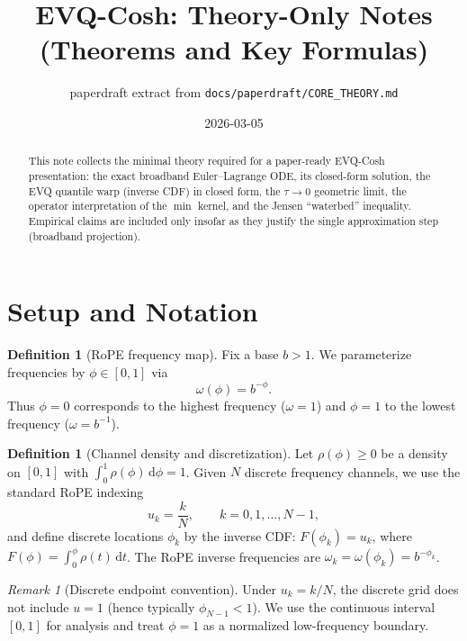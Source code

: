 \documentclass[11pt]{article}
\title{EVQ-Cosh: Theory-Only Notes (Theorems and Key Formulas)}
\author{paperdraft extract from \texttt{docs/paperdraft/CORE\_THEORY.md}}
\date{2026-03-05}
\theoremstyle{plain}
\theoremstyle{definition}
\newtheorem{definition}[theorem]{Definition}
\theoremstyle{remark}
\newtheorem{remark}[theorem]{Remark}
\newcommand{\dd}{\,\mathrm{d}}
\begin{document}
\maketitle

\begin{abstract}
This note collects the minimal theory required for a paper-ready EVQ-Cosh
presentation: the exact broadband Euler--Lagrange ODE, its closed-form solution,
the EVQ quantile warp (inverse CDF) in closed form, the $\tau\to 0$ geometric
limit, the operator interpretation of the $\min$ kernel, and the Jensen
``waterbed'' inequality. Empirical claims are included only insofar as they
justify the single approximation step (broadband projection).
\end{abstract}

\section{Setup and Notation}

\begin{definition}[RoPE frequency map]
Fix a base $b>1$. We parameterize frequencies by $\phi\in[0,1]$ via
\begin{equation}
\omega(\phi)=b^{-\phi}.
\end{equation}
Thus $\phi=0$ corresponds to the highest frequency ($\omega=1$) and $\phi=1$ to
the lowest frequency ($\omega=b^{-1}$).
\end{definition}

\begin{definition}[Channel density and discretization]
Let $\rho(\phi)\ge 0$ be a density on $[0,1]$ with $\int_0^1\rho(\phi)\dd\phi=1$.
Given $N$ discrete frequency channels, we use the standard RoPE indexing
\begin{equation}
u_k=\frac{k}{N},\qquad k=0,1,\dots,N-1,
\end{equation}
and define discrete locations $\phi_k$ by the inverse CDF:
$F(\phi_k)=u_k$, where $F(\phi)=\int_0^\phi\rho(t)\dd t$.
The RoPE inverse frequencies are $\omega_k=\omega(\phi_k)=b^{-\phi_k}$.
\end{definition}

\begin{remark}[Discrete endpoint convention]
Under $u_k=k/N$, the discrete grid does not include $u=1$ (hence typically
$\phi_{N-1}<1$). We use the continuous interval $[0,1]$ for analysis and treat
$\phi=1$ as a normalized low-frequency boundary.
\end{remark}
\end{document}
